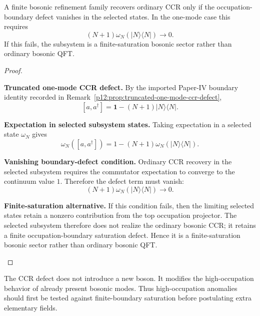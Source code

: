 \documentclass[12pt,a4paper]{article}
\begin{document}
\begin{corollary}
\label{p12:cor:ccr-regular-subsystem-condition}
A finite bosonic refinement family recovers ordinary CCR only if the occupation-boundary defect vanishes in the selected states.  In the one-mode case this requires
\[
(N+1)\omega_N(|N\rangle\langle N|)\to0.
\]
If this fails, the subsystem is a finite-saturation bosonic sector rather than ordinary bosonic QFT.
\end{corollary}
\begin{proof}
\begin{proofsteps}
\item \textbf{Truncated one-mode CCR defect.}
By the imported Paper-IV boundary identity recorded in Remark~\ref{p12:prop:truncated-one-mode-ccr-defect},
\[
[a,a^\dagger]
=
\mathbf1-(N+1)|N\rangle\langle N|.
\]

\item \textbf{Expectation in selected subsystem states.}
Taking expectation in a selected state \(\omega_N\) gives
\[
\omega_N([a,a^\dagger])
=
1-(N+1)\omega_N(|N\rangle\langle N|).
\]

\item \textbf{Vanishing boundary-defect condition.}
Ordinary CCR recovery in the selected subsystem requires the commutator expectation to converge to the continuum value \(1\).  Therefore the defect term must vanish:
\[
(N+1)\omega_N(|N\rangle\langle N|)\to0.
\]

\item \textbf{Finite-saturation alternative.}
If this condition fails, then the limiting selected states retain a nonzero contribution from the top occupation projector.  The selected subsystem therefore does not realize the ordinary bosonic CCR; it retains a finite occupation-boundary saturation defect.  Hence it is a finite-saturation bosonic sector rather than ordinary bosonic QFT.
\end{proofsteps}
\end{proof}

\begin{remark}
\label{p12:rem:new-physics-ccr-failure}
The CCR defect does not introduce a new boson.  It modifies the high-occupation behavior of already present bosonic modes.  Thus high-occupation anomalies should first be tested against finite-boundary saturation before postulating extra elementary fields.
\end{remark}
\end{document}
